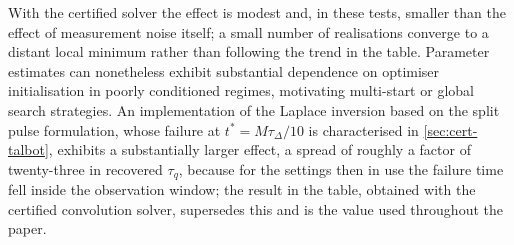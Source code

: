 \documentclass[preprint,12pt,a4paper]{elsarticle}
\theoremstyle{plain}
\theoremstyle{definition}
\theoremstyle{remark}
\newcommand{\tq}{\tau_{q}}
\begin{document}
With the certified solver the effect is modest and, in these tests, smaller
than the effect of measurement noise itself; a small number of realisations
converge to a distant local minimum rather than following the trend in the
table. Parameter estimates can nonetheless exhibit substantial dependence on
optimiser initialisation in poorly conditioned regimes, motivating multi-start
or global search strategies. An implementation of the Laplace inversion based
on the split pulse formulation, whose failure at $t^{\ast}=M\tau_{\Delta}/10$
is characterised in \cref{sec:cert-talbot}, exhibits a substantially larger
effect, a spread of roughly a factor of twenty-three in recovered $\tq$,
because for the settings then in use the failure time fell inside the
observation window; the result in the table, obtained with the certified
convolution solver, supersedes this and is the value used throughout the
paper.




\end{document}
